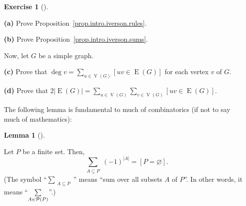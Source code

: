 \documentclass[numbers=enddot,12pt,final,onecolumn,notitlepage]{scrartcl}%
\theoremstyle{definition}
\newtheorem{lem}[theo]{Lemma}
\newenvironment{lemma}[1][]
{\begin{lem}[#1]\begin{leftbar}}
{\end{leftbar}\end{lem}}
\newtheorem{exmp}[theo]{Exercise}
\newenvironment{exercise}[1][]
{\begin{exmp}[#1]\begin{leftbar}}
{\end{leftbar}\end{exmp}}
\let\sumnonlimits\sum
\renewcommand{\sum}{\sumnonlimits\limits}
\newcommand{\powset}[2][]{\ifthenelse{\equal{#2}{}}{\mathcal{P}\left(#1\right)}{\mathcal{P}_{#1}\left(#2\right)}}
\newcommand{\abs}[1]{\left| #1 \right|}
\newcommand{\tup}[1]{\left( #1 \right)}
\newcommand{\ive}[1]{\left[ #1 \right]}
\newcommand{\verts}[1]{\operatorname{V}\left( #1 \right)}
\newcommand{\edges}[1]{\operatorname{E}\left( #1 \right)}
\begin{document}
\begin{exercise} \label{exe.intro.iverson}
\textbf{(a)} Prove Proposition~\ref{prop.intro.iverson.rules}.

\textbf{(b)} Prove Proposition~\ref{prop.intro.iverson.sums}.

Now, let $G$ be a simple graph.

\textbf{(c)} Prove that
$\deg v = \sum_{u \in \verts{G}} \ive{uv \in \edges{G}}$
for each vertex $v$ of $G$.

\textbf{(d)} Prove that
$2 \abs{\edges{G}}
= \sum_{u \in \verts{G}} \sum_{v \in \verts{G}}
  \ive{uv \in \edges{G}}$.
\end{exercise}

The following lemma is fundamental to much of combinatorics (if not
to say much of mathematics):

\begin{lemma} \label{lem.dominating.heinrich-lemma1}
Let $P$ be a finite set. Then,
\[
\sum_{\substack{A \subseteq P}} \tup{-1}^{\abs{A}}
= \ive{P = \varnothing} .
\]
(The symbol ``$\sum_{\substack{A \subseteq P}}$'' means ``sum over
all subsets $A$ of $P$''. In other words, it means
``$\sum_{\substack{A \in \powset{P}}}$''.)
\end{lemma}
\end{document}
